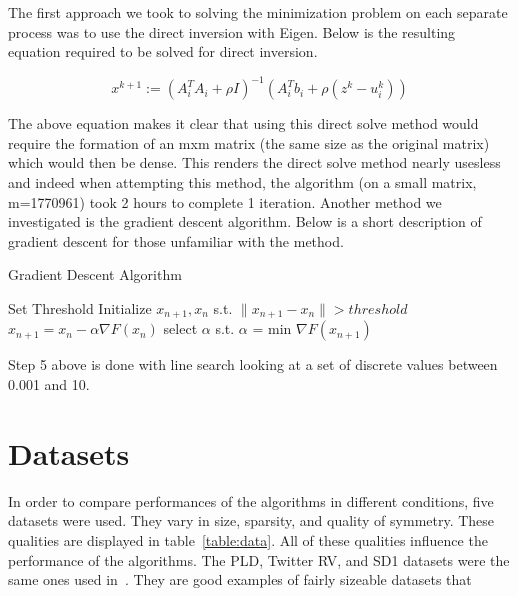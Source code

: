 \documentclass[letterpaper,11pt,onecolumn]{article}
\begin{document}
The first approach we took to solving the minimization problem on each separate process was to use the direct inversion with Eigen. Below is the resulting equation required to be solved for direct inversion.
\begin{center}
  \begin{equation}
	x^{k+1} := (A_{i}^{T}A_{i} + \rho I)^{-1}(A_{i}^{T}b_{i} + \rho(z^{k} - u_{i}^{k}))
	\label{}
  \end{equation}
\end{center}
The above equation makes it clear that using this direct solve method would require the formation of an mxm matrix (the same size as the original matrix) which would then be dense. This renders the direct solve method nearly usesless and indeed when attempting this method, the algorithm (on a small matrix, m=1770961) took 2 hours to complete 1 iteration.
\newline
\linebreak
Another method we investigated is the gradient descent algorithm. Below is a short description of gradient descent for those unfamiliar with the method.

\begin{center}
  \begin{algorithm}
	\caption{Gradient Descent Algorithm}
	\begin{algorithmic}[1]
	  \STATE Set Threshold
	  \STATE Initialize $x_{n+1}, x_{n}$ s.t. $\|x_{n+1} - x_{n}\| > threshold$
	  \STATE $x_{n+1} = x_{n} - \alpha \nabla F(x_{n})$
	  \STATE select $\alpha$  s.t. $\alpha$ = min $\nabla F(x_{n+1})$
	  \ENDWHILE
	\end{algorithmic}
  \end{algorithm}
\end{center}
Step 5 above is done with line search looking at a set of discrete values between 0.001 and 10.

\section{Datasets}
In order to compare performances of the algorithms in different conditions, five datasets were used. They vary in size, sparsity, and quality of symmetry. These qualities are displayed in table~\ref{table:data}. All of these qualities influence the performance of the algorithms. The PLD, Twitter RV, and SD1 datasets were the same ones used in~\cite{Joyce}. They are good examples of fairly sizeable datasets that 
\end{document}
